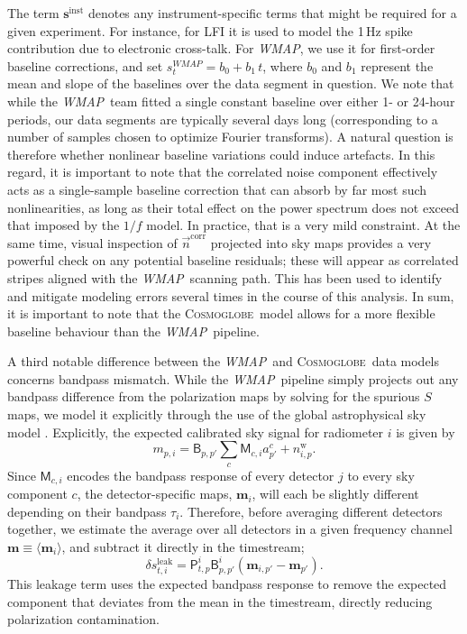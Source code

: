 \documentclass[twocolumn]{../../common/aa}
\def\WMAP{\emph{WMAP}}
\newcommand{\n}[0]{\vec{n}}
\newcommand{\cosmoglobe}{\textsc{Cosmoglobe}}
\begin{document}
The term $\boldsymbol s^\mathrm{inst}$ denotes any instrument-specific terms that might be required for a given experiment. For instance, for LFI it is used to model the 1\,Hz spike contribution due to electronic cross-talk. For \WMAP, we use it for first-order baseline corrections, and set $s^\mathit{WMAP}_t = b_0 + b_1\,t$, where $b_0$ and $b_1$ represent the mean and slope of the baselines over the data segment in question. We note that while the \WMAP\ team fitted a single constant baseline over either 1- or 24-hour periods, our data segments are typically several days long (corresponding to a number of samples chosen to optimize Fourier transforms). A natural question is therefore whether nonlinear baseline variations could induce artefacts. In this regard, it is important to note that the correlated noise component effectively acts as a single-sample baseline correction that can absorb by far most such nonlinearities, as long as their total effect on the power spectrum does not exceed that imposed by the $1/f$ model. In practice, that is a very mild constraint. At the same time, visual inspection of $\n^{\mathrm{corr}}$ projected into sky maps provides a very powerful check on any potential baseline residuals; these will appear as correlated stripes aligned with the \WMAP\ scanning path. This has been used to identify and mitigate modeling errors several times in the course of this analysis. In sum, it is important to note that the \cosmoglobe\ model allows for a more flexible baseline behaviour than the \WMAP\ pipeline.

A third notable difference between the \WMAP\ and \cosmoglobe\ data models concerns bandpass mismatch. While the \WMAP\ pipeline simply projects out any bandpass difference from the polarization maps by solving for the spurious $S$ maps, we model it explicitly through the use of the global astrophysical sky model \citep{bp09}. Explicitly, the expected calibrated sky signal for radiometer $i$ is given by
\begin{equation}
	m_{p,i}=\mathsf B_{p,p'}\sum_c\mathsf M_{c,i}a^c_{p'}+n_{i,p}^\mathrm w.
\end{equation}
Since $\mathsf M_{c,i}$ encodes the bandpass response of every detector $j$ to every sky component $c$, the detector-specific maps, $\boldsymbol m_i$, will each be slightly different depending on their bandpass $\tau_i$. Therefore, before averaging different detectors together, we estimate the average over all detectors in a given frequency channel $\boldsymbol m\equiv \langle \boldsymbol m_i\rangle$, and subtract it directly in the timestream;
\begin{equation}
	\delta s_{t,i}^\mathrm{leak}=\mathsf P_{t,p}^i\mathsf B_{p,p'}^i\left(\boldsymbol m_{i,p'}-\boldsymbol m_{p'}\right).
\end{equation}
This leakage term uses the expected bandpass response to remove the expected component that deviates from the mean in the timestream, directly reducing polarization contamination. 
\end{document}
